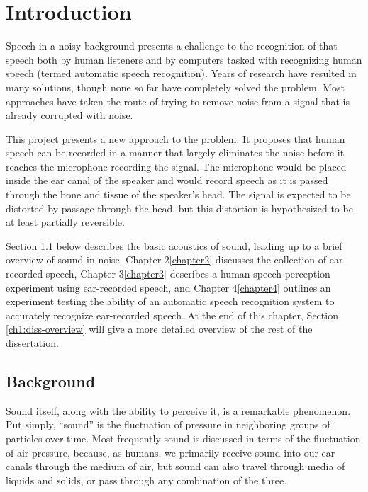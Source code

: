 \documentclass[dissertation,copyright]{uathesis}
\begin{document}



 



\chapter{Introduction\label{chapter1}}

Speech in a noisy background presents a challenge to the recognition of that speech both by human listeners and by computers tasked with recognizing human speech (termed automatic speech recognition).  Years of research have resulted in many solutions, though none so far have completely solved the problem.  Most approaches have taken the route of trying to remove noise from a signal that is already corrupted with noise.

This project presents a new approach to the problem.  It proposes that human speech can be recorded in a manner that largely eliminates the noise before it reaches the microphone recording the signal.  The microphone would be placed inside the ear canal of the speaker and would record speech as it is passed through the bone and tissue of the speaker's head.  The signal is expected to be distorted by passage through the head, but this distortion is hypothesized to be at least partially reversible.

Section \ref{ch1:background} below describes the basic acoustics of sound, leading up to a brief overview of sound in noise.  Chapter 2\ref{chapter2} discusses the collection of ear-recorded speech, Chapter 3\ref{chapter3} describes a human speech perception experiment using ear-recorded speech, and Chapter 4\ref{chapter4} outlines an experiment testing the ability of an automatic speech recognition system to accurately recognize ear-recorded speech.  At the end of this chapter, Section \ref{ch1:diss-overview} will give a more detailed overview of the rest of the dissertation.

\section{Background}\label{ch1:background}

Sound itself, along with the ability to perceive it, is a remarkable phenomenon.  Put simply, ``sound'' is the fluctuation of pressure in neighboring groups of particles over time. Most frequently sound is discussed in terms of the fluctuation of air pressure, because, as humans, we primarily receive sound into our ear canals through the medium of air, but sound can also travel through media of liquids and solids, or pass through any combination of the three.
\end{document}
